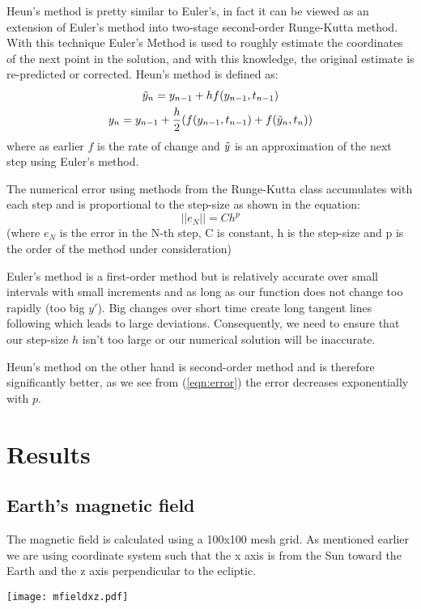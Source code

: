 \documentclass[final,5p,times,twocolumn,authoryear]{elsarticle}
\begin{document}
Heun's method is pretty similar to Euler's, in fact it can be viewed as an extension of Euler's method into two-stage second-order Runge-Kutta method.
With this technique Euler's Method is used to roughly estimate the coordinates of the next point in the solution, and with this knowledge, the original estimate is re-predicted or corrected. Heun's method \cite{lecture} is defined as:
\begin{gather}\label{eqs:heun}
    \Tilde{y}_n = y_{n-1} + h f(y_{n-1},t_{n-1})
    \\
    y_n = y_{n-1} + \frac{h}{2} (f(y_{n-1},t_{n-1})+f(\Tilde{y}_n,t_n))
\end{gather} 
where as earlier $f$ is the rate of change and $\Tilde{y}$ is an approximation of the next step using Euler's method.

The numerical error using methods from the Runge-Kutta class accumulates with each step and is proportional to the step-size \cite{lecture} as shown in the equation:
\begin{equation}\label{eqn:error}
        ||e_N|| = Ch^p
\end{equation}
(where $e_N$ is the error in the N-th step, C is constant, h is the step-size and p is the order of the method under consideration) 

Euler's method is a first-order method but is relatively accurate over small intervals with small increments and as long as our function does not change too rapidly (too big $y'$). Big changes over short time create long tangent lines following which leads to large deviations. Consequently, we need to ensure that our step-size $h$ isn't too large or our numerical solution will be inaccurate.

Heun's method on the other hand is second-order method and is therefore significantly better, as we see from (\ref{eqn:error}) the error decreases exponentially with $p$.
\section{Results}
\label{Results}
\subsection{Earth's magnetic field}
The magnetic field is calculated using a 100x100 mesh grid. As mentioned earlier we are using coordinate system such that the x axis is from the Sun toward the Earth and the z axis perpendicular to the
ecliptic.

\begin{center} \label{fig: mfieldx}
\texttt{[image: mfieldxz.pdf]}
\end{center}
\end{document}
